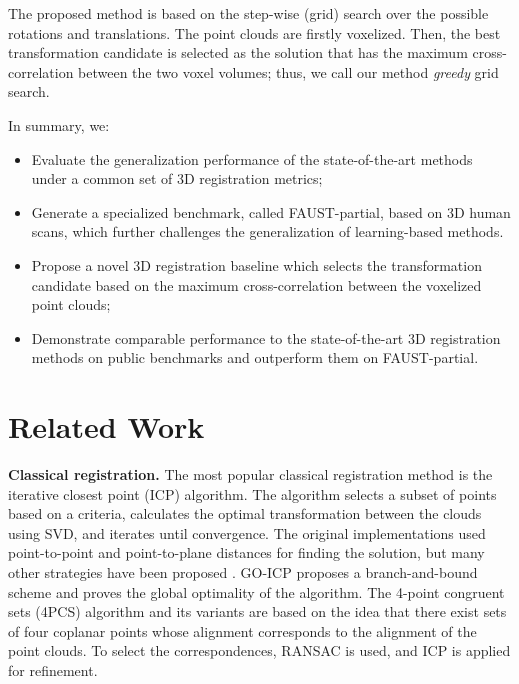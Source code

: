 \documentclass{bmvc2k}
\begin{document}
The proposed method is based on the step-wise (grid) search over the possible rotations and translations. 
The point clouds are firstly voxelized. Then, the best transformation candidate is selected as the solution that has the maximum cross-correlation between the two voxel volumes; thus, we call our method \textit{greedy} grid search.

In summary, we:
\begin{itemize}
    \item Evaluate the generalization performance of the state-of-the-art methods under a common set of 3D registration metrics; 
    
    \item Generate a specialized benchmark, called FAUST-partial, based on 3D human scans, which further challenges the generalization of learning-based methods.

    \item Propose a novel 3D registration baseline which selects the transformation candidate based on the maximum cross-correlation between the voxelized point clouds;
    
    \item Demonstrate comparable performance to the state-of-the-art 3D registration methods on public benchmarks and outperform them on FAUST-partial.
\end{itemize}

\section{Related Work}

\textbf{Classical registration.} The most popular classical registration method is the iterative closest point (ICP) algorithm. The algorithm selects a subset of points based on a criteria, calculates the optimal transformation between the clouds using SVD, and iterates until convergence. The original implementations used point-to-point \cite{point2point-icp} and point-to-plane \cite{point2plane-icp} distances for finding the solution, but many other strategies have been proposed \cite{aa-icp, go-icp, trimmed-icp, iterative-global-similarity-points}. GO-ICP \cite{go-icp} proposes a branch-and-bound scheme and proves the global optimality of the algorithm. The 4-point congruent sets (4PCS) algorithm \cite{4pcs} and its variants \cite{v4pcs, generalized-4pcs} are based on the idea that there exist sets of four coplanar points whose alignment corresponds to the alignment of the point clouds. To select the correspondences, RANSAC is used, and ICP is applied for refinement.
\end{document}
